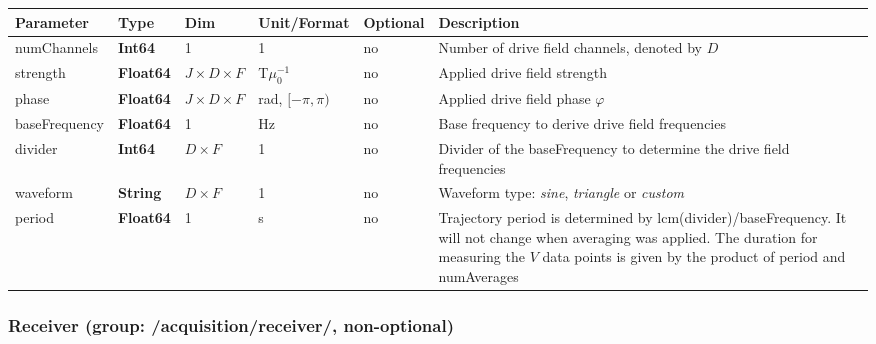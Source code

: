 \documentclass[landscape,a4paper]{article} %
\newcommand{\inltab}[1]{{\ttfamily\bfseries\color{blue}#1}}
\newcommand{\inlvar}[1]{{\ttfamily#1}}
\begin{document}
\noindent \begin{tabularx}{\columnwidth}{lllllX} 
\textbf{Parameter} & \textbf{Type} & \textbf{Dim} & \textbf{Unit/Format} & \textbf{Optional} & \textbf{Description} \\ \hline 
\inlvar{numChannels} & \inltab{Int64} & 1 & 1 & no & Number of drive field channels, denoted by $D$ \\ \hline
\inlvar{strength} & \inltab{Float64} & $J \times D \times F $ & T$\mu_0^{-1}$ & no & Applied drive field strength \\ \hline
\inlvar{phase} & \inltab{Float64} & $J \times D \times F$ & rad, $[-\pi,\pi)$ & no & Applied drive field phase $\varphi$\\ \hline
\inlvar{baseFrequency} & \inltab{Float64} & 1 & Hz & no & Base frequency to derive drive field frequencies \\ \hline
\inlvar{divider} & \inltab{Int64} & $D \times F$ & 1 & no & Divider of the \inlvar{baseFrequency} to determine the drive field frequencies \\ \hline
\inlvar{waveform} & \inltab{String} & $D \times F$ & 1 & no & Waveform type: \textit{sine}, \textit{triangle} or \textit{custom} \\ \hline
\inlvar{period} & \inltab{Float64} & 1 & s & no & Trajectory period is determined by lcm(\inlvar{divider})/\inlvar{baseFrequency}. It will not change when averaging was applied. The duration for measuring the $V$ data points is given by the product of  \inlvar{period} and \inlvar{numAverages} \\ \hline
\end{tabularx}


\subsubsection{Receiver (group: \inlvar{/acquisition/receiver/}, non-optional)}
\end{document}
